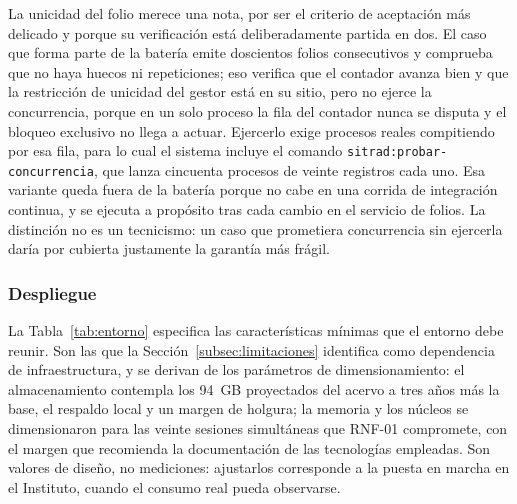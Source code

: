 La unicidad del folio merece una nota, por ser el criterio de aceptación más delicado y porque su verificación está deliberadamente partida en dos. El caso que forma parte de la batería emite doscientos folios consecutivos y comprueba que no haya huecos ni repeticiones; eso verifica que el contador avanza bien y que la restricción de unicidad del gestor está en su sitio, pero no ejerce la concurrencia, porque en un solo proceso la fila del contador nunca se disputa y el bloqueo exclusivo no llega a actuar. Ejercerlo exige procesos reales compitiendo por esa fila, para lo cual el sistema incluye el comando \texttt{sitrad:probar-concurrencia}, que lanza cincuenta procesos de veinte registros cada uno. Esa variante queda fuera de la batería porque no cabe en una corrida de integración continua, y se ejecuta a propósito tras cada cambio en el servicio de folios. La distinción no es un tecnicismo: un caso que prometiera concurrencia sin ejercerla daría por cubierta justamente la garantía más frágil.

\subsubsection*{Despliegue}

La Tabla~\ref{tab:entorno} especifica las características mínimas que el entorno debe reunir. Son las que la Sección~\ref{subsec:limitaciones} identifica como dependencia de infraestructura, y se derivan de los parámetros de dimensionamiento: el almacenamiento contempla los 94~GB proyectados del acervo a tres años más la base, el respaldo local y un margen de holgura; la memoria y los núcleos se dimensionaron para las veinte sesiones simultáneas que RNF-01 compromete, con el margen que recomienda la documentación de las tecnologías empleadas. Son valores de diseño, no mediciones: ajustarlos corresponde a la puesta en marcha en el Instituto, cuando el consumo real pueda observarse.

